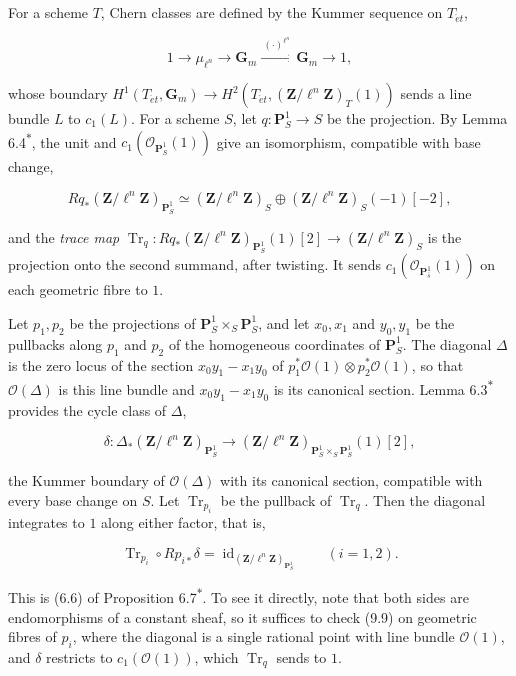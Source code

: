 \documentclass[11pt]{article}
\newcommand{\bpout}[1]{#1\textsuperscript{\hyperlink{bp-outside}{\ensuremath{\ast}}}}
\begin{document}
For a scheme \(T\), Chern classes are defined by the Kummer sequence on \(T_{\acute{e}t}\),

\[
1\longrightarrow\mu_{\ell^n}\longrightarrow\mathbf G_m
\xrightarrow{\ (\cdot)^{\ell^n}\ }\mathbf G_m
\longrightarrow1,
\tag{9.7}
\]

whose boundary \(H^1(T_{\acute{e}t},\mathbf G_m)\to
H^2(T_{\acute{e}t},(\mathbf Z/\ell^n\mathbf Z)_T(1))\) sends a line bundle \(L\) to \(c_1(L)\). For a scheme \(S\), let \(q:\mathbf P^1_S\to S\) be the projection. By Lemma \bpout{6.4}, the unit and \(c_1(\mathcal O_{\mathbf P^1_S}(1))\) give an isomorphism, compatible with base change,

\[
Rq_*(\mathbf Z/\ell^n\mathbf Z)_{\mathbf P^1_S}
\simeq(\mathbf Z/\ell^n\mathbf Z)_{S}\oplus(\mathbf Z/\ell^n\mathbf Z)_{S}(-1)[-2],
\tag{9.8}
\]

and the \emph{trace map} \(\operatorname{Tr}_q:Rq_*(\mathbf Z/\ell^n\mathbf Z)_{\mathbf P^1_S}(1)[2]
\to(\mathbf Z/\ell^n\mathbf Z)_{S}\) is the projection onto the second summand, after twisting. It sends \(c_1(\mathcal O_{\mathbf P^1_{\bar s}}(1))\) on each geometric fibre to \(1\).

Let \(p_1,p_2\) be the projections of \(\mathbf P^1_S\times_S\mathbf P^1_S\), and let \(x_0,x_1\) and \(y_0,y_1\) be the pullbacks along \(p_1\) and \(p_2\) of the homogeneous coordinates of \(\mathbf P^1_S\). The diagonal \(\Delta\) is the zero locus of the section \(x_0y_1-x_1y_0\) of \(p_1^*\mathcal O(1)\otimes p_2^*\mathcal O(1)\), so that \(\mathcal O(\Delta)\) is this line bundle and \(x_0y_1-x_1y_0\) is its canonical section. Lemma \bpout{6.3} provides the cycle class of \(\Delta\),

\[
\delta:\Delta_*(\mathbf Z/\ell^n\mathbf Z)_{\mathbf P^1_S}
\longrightarrow(\mathbf Z/\ell^n\mathbf Z)_{\mathbf P^1_S\times_S\mathbf P^1_S}(1)[2],
\]

the Kummer boundary of \(\mathcal O(\Delta)\) with its canonical section, compatible with every base change on \(S\). Let \(\operatorname{Tr}_{p_i}\) be the pullback of \(\operatorname{Tr}_q\). Then the diagonal integrates to \(1\) along either factor, that is,

\[
\operatorname{Tr}_{p_i}\circ Rp_{i*}\delta
=\operatorname{id}_{(\mathbf Z/\ell^n\mathbf Z)_{\mathbf P^1_S}}
\qquad(i=1,2).
\tag{9.9}
\]

This is (6.6) of Proposition \bpout{6.7}. To see it directly, note that both sides are endomorphisms of a constant sheaf, so it suffices to check (9.9) on geometric fibres of \(p_i\), where the diagonal is a single rational point with line bundle \(\mathcal O(1)\), and \(\delta\) restricts to \(c_1(\mathcal O(1))\), which \(\operatorname{Tr}_q\) sends to \(1\).
\end{document}
